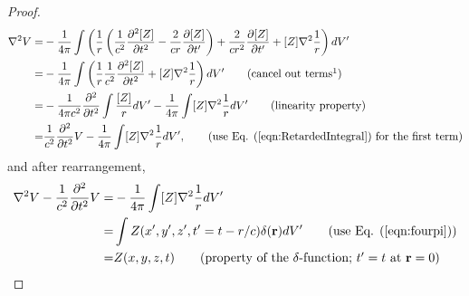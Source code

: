 \documentclass[11pt]{article}              %
\begin{document}
\begin{proof}
\begin{align}
    \nabla^2 V=&-\frac{1}{4\pi}\int \left(\frac{1}{r}\left(\frac{1}{c^2}\frac{\partial^2 [Z]}{\partial t^2}-\frac{2}{cr}\frac{\partial [Z]}{\partial t^\prime}\right)+\frac{2}{cr^2}\frac{\partial [Z]}{\partial t^\prime}+[Z]\nabla^2 \frac{1}{r}\right)dV^\prime\notag\\
    =&-\frac{1}{4\pi}\int \left(\frac{1}{r}\frac{1}{c^2}\frac{\partial^2 [Z]}{\partial t^2}+[Z]\nabla^2 \frac{1}{r}\right)dV^\prime\tag{cancel out terms\footnotemark}\\
    =&-\frac{1}{4\pi c^2}\frac{\partial^2}{\partial t^2}\int \frac{[Z]}{r}dV^\prime-\frac{1}{4\pi}\int[Z]\nabla^2 \frac{1}{r}dV^\prime\tag{linearity property}\\
    =&\frac{1}{c^2}\frac{\partial^2}{\partial t^2}V-\frac{1}{4\pi}\int[Z]\nabla^2 \frac{1}{r}dV^\prime,\tag{use Eq. (\ref{eqn:RetardedIntegral}) for the first term}
\end{align}
and after rearrangement,
\begin{align}
    \nabla^2 V-\frac{1}{c^2}\frac{\partial^2}{\partial t^2}V=&-\frac{1}{4\pi}\int [Z]\nabla^2 \frac{1}{r}dV^\prime\notag\\
    =&\int Z(x^\prime,y^\prime,z^\prime,t^\prime=t-r/c) \delta({\mathbf r}) dV^\prime\tag{use Eq. (\ref{eqn:fourpi})}\\
    =&Z(x,y,z,t)\tag{property of the $\delta$-function; $t^\prime=t$ at $\mathbf{r}=0$}
\end{align}

\end{proof}
\end{document}
